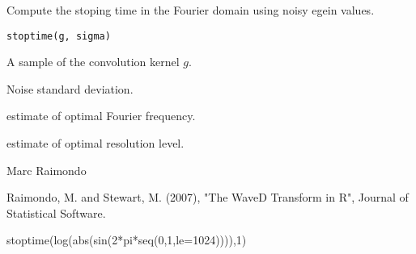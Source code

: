 \begin{Description}\relax
Compute the stoping time in the Fourier domain using noisy egein values.
\end{Description}
\begin{Usage}
\begin{verbatim}
stoptime(g, sigma)
\end{verbatim}
\end{Usage}
\begin{Arguments}
\begin{ldescription}
\item[\code{g}] A sample of the convolution kernel $g$. 
\item[\code{sigma}] Noise standard deviation.
\end{ldescription}
\end{Arguments}
\begin{Value}
\begin{ldescription}
\item[\code{M}] estimate of optimal Fourier frequency.
\item[\code{j1}] estimate of optimal resolution level.
\end{ldescription}
\end{Value}
\begin{Author}\relax
Marc Raimondo
\end{Author}
\begin{References}\relax
Raimondo, M. and Stewart, M. (2007),
"The WaveD Transform in R", Journal of Statistical Software.
\end{References}
\begin{SeeAlso}\relax
{}
\end{SeeAlso}
\begin{Examples}
\begin{ExampleCode}
stoptime(log(abs(sin(2*pi*seq(0,1,le=1024)))),1)
\end{ExampleCode}
\end{Examples}

